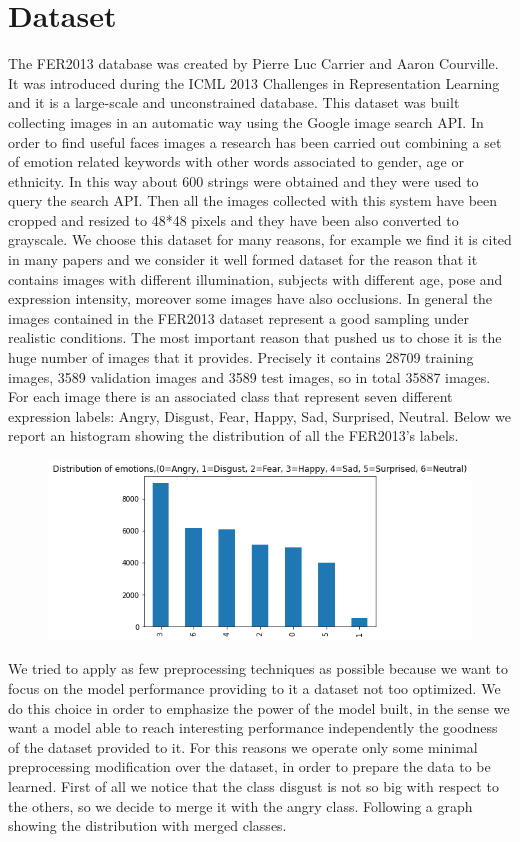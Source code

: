 \documentclass[10pt,twocolumn,letterpaper]{article}
\begin{document}
\section{Dataset}
The FER2013 database was created by Pierre Luc Carrier and Aaron Courville. It was introduced during the ICML 2013 Challenges in Representation Learning and it is a large-scale and unconstrained database. This dataset was built collecting images in an automatic way using the Google image search API. In order to find useful faces images a research has been carried out combining a set of emotion related keywords with other words associated to gender, age or ethnicity. In this way about 600 strings were obtained and they were used to query the search API. Then all the images collected with this system have been cropped and resized to 48*48 pixels and they have been also converted to grayscale. We choose this dataset for many reasons, for example we find it is cited in many papers and we consider it well formed dataset for the reason that it contains images with different illumination, subjects with different age, pose and expression intensity, moreover some images have also occlusions. In general the images contained in the FER2013 dataset represent a good sampling under realistic conditions. The most important reason that pushed us to chose it is the huge number of images that it provides. Precisely it contains 28709 training images, 3589 validation images and 3589 test images, so in total 35887 images. For each image there is an associated class that represent seven different expression labels: Angry, Disgust, Fear, Happy, Sad, Surprised, Neutral. Below we report an histogram showing the distribution of all the FER2013's labels.
\begin{figure}[H]
   \centering
   \includegraphics[width=1\linewidth]{./immagini/7_classi.png}
\end{figure}
We tried to apply as few preprocessing techniques as possible because we want to focus on the model performance providing to it a dataset not too optimized. We do this choice in order to emphasize the power of the model built, in the sense we want a model able to reach interesting performance independently the goodness of the dataset provided to it. For this reasons we operate only some minimal preprocessing modification over the dataset, in order to prepare the data to be learned. First of all we notice that the class disgust is not so big with respect to the others, so we decide to merge it with the angry class. Following a graph showing the distribution with merged classes.
\end{document}
